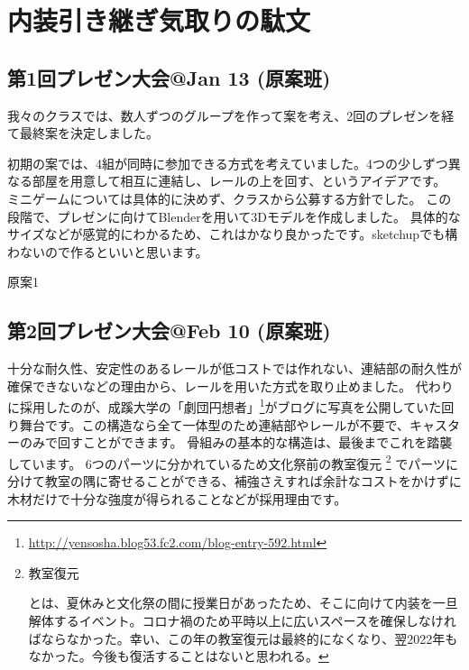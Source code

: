 \documentclass[uplatex,dvipdfmx]{jsarticle}
\begin{document}
\section{内装引き継ぎ気取りの駄文}

\subsection{第1回プレゼン大会@Jan 13 (原案班)}

我々のクラスでは、数人ずつのグループを作って案を考え、2回のプレゼンを経て最終案を決定しました。

初期の案では、4組が同時に参加できる方式を考えていました。4つの少しずつ異なる部屋を用意して相互に連結し、レールの上を回す、というアイデアです。
ミニゲームについては具体的に決めず、クラスから公募する方針でした。
この段階で、プレゼンに向けてBlenderを用いて3Dモデルを作成しました。
具体的なサイズなどが感覚的にわかるため、これはかなり良かったです。sketchupでも構わないので作るといいと思います。

\begin{imageHere}{原案1}
\end{imageHere}

\clearpage

\subsection{第2回プレゼン大会@Feb 10 (原案班)}

十分な耐久性、安定性のあるレールが低コストでは作れない、連結部の耐久性が確保できないなどの理由から、レールを用いた方式を取り止めました。
代わりに採用したのが、成蹊大学の「劇団円想者」\footnote{\url{http://yensosha.blog53.fc2.com/blog-entry-592.html}}がブログに写真を公開していた回り舞台です。この構造なら全て一体型のため連結部やレールが不要で、キャスターのみで回すことができます。
骨組みの基本的な構造は、最後までこれを踏襲しています。
6つのパーツに分かれているため文化祭前の教室復元
    \footnote{\hypertarget{note:教室復元}{教室復元}とは、夏休みと文化祭の間に授業日があったため、そこに向けて内装を一旦解体するイベント。コロナ禍のため平時以上に広いスペースを確保しなければならなかった。幸い、この年の教室復元は最終的になくなり、翌2022年もなかった。今後も復活することはないと思われる。}
でパーツに分けて教室の隅に寄せることができる、補強さえすれば余計なコストをかけずに木材だけで十分な強度が得られることなどが採用理由です。
\end{document}
